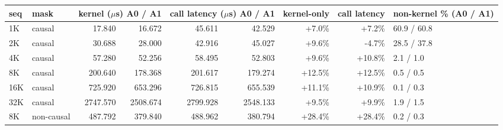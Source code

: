 \begingroup
{}
\label{tab:appx-nsys-kernel}\label{tab:appx-nsys-launch}
\par\medskip{}\par\smallskip
{}
{\scriptsize\setlength{\tabcolsep}{3pt}
\begin{longtable}{@{}llrrrrrrl@{}}
\toprule
\textbf{seq} & \textbf{mask} & \multicolumn{2}{c}{\textbf{kernel (\(\mu\)s) A0 / A1}} & \multicolumn{2}{c}{\textbf{call latency (\(\mu\)s) A0 / A1}} & \textbf{kernel-only} & \textbf{call latency} & \textbf{non-kernel \% (A0 / A1)} \\
\midrule
\endhead
1K & causal & 17.840 & 16.672 & 45.611 & 42.529 & +7.0\% & +7.2\% & 60.9 / 60.8 \\
2K & causal & 30.688 & 28.000 & 42.916 & 45.027 & +9.6\% & -4.7\% & 28.5 / 37.8 \\
4K & causal & 57.280 & 52.256 & 58.495 & 52.803 & +9.6\% & +10.8\% & 2.1 / 1.0 \\
8K & causal & 200.640 & 178.368 & 201.617 & 179.274 & +12.5\% & +12.5\% & 0.5 / 0.5 \\
16K & causal & 725.920 & 653.296 & 726.815 & 655.539 & +11.1\% & +10.9\% & 0.1 / 0.3 \\
32K & causal & 2747.570 & 2508.674 & 2799.928 & 2548.133 & +9.5\% & +9.9\% & 1.9 / 1.5 \\
8K & non-causal & 487.792 & 379.840 & 488.962 & 380.794 & +28.4\% & +28.4\% & 0.2 / 0.3 \\
\bottomrule
\end{longtable}
\addtocounter{table}{-1}
}
\endgroup
